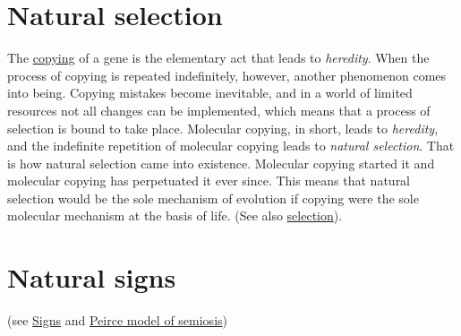 \documentclass[12pt]{article}
\begin{document}
\hypertarget{natural_selection}{}
\section{Natural selection}
The \hyperlink{copying_and_coding}{copying} of a gene is the elementary act that leads to \textit{heredity}. When the process of copying is repeated indefinitely, however, another phenomenon comes into being. Copying mistakes become inevitable, and in a world of limited resources not all changes can be implemented, which means that a process of selection is bound to take place. Molecular copying, in short, leads to \textit{heredity}, and the indefinite repetition of molecular copying leads to \textit{natural selection}. That is how natural selection came into existence. Molecular copying started it and molecular copying has perpetuated it ever since. This means that natural selection would be the sole mechanism of evolution if copying were the sole molecular mechanism at the basis of life. (See also \hyperlink{selection}{selection}).


\hypertarget{natural_signs}{}
\section{Natural signs} 

(see \hyperlink{signs}{Signs} and \hyperlink{peirce_model_of_semiosis}{Peirce model of semiosis}) 


\hypertarget{neural_code}{}
\end{document}
